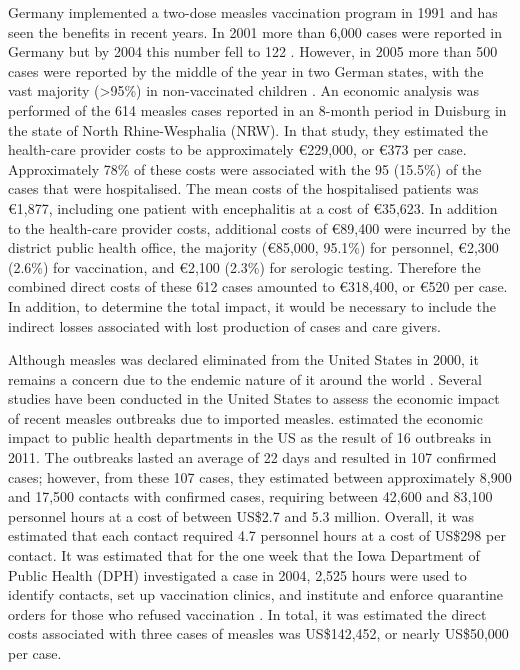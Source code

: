 \documentclass{article}
\begin{document}
Germany implemented a two-dose measles vaccination program in 1991 and has seen the benefits in recent years. In 2001 more than 6,000 cases were reported in Germany but by 2004 this number fell to 122 \citep{wichmann9}. However, in 2005 more than 500 cases were reported by the middle of the year in two German states, with the vast majority (>95\%) in non-vaccinated children \citep{siedler6}. An economic analysis was performed of the 614 measles cases reported in an 8-month period in Duisburg in the state of North Rhine-Wesphalia (NRW). In that study, they estimated the health-care provider costs to be approximately \euro 229,000, or \euro 373 per case. Approximately 78\% of these costs were associated with the 95 (15.5\%) of the cases that were hospitalised. The mean costs of the hospitalised patients was  \euro 1,877, including one patient with encephalitis at a cost of \euro 35,623. In addition to the health-care provider costs, additional costs of \euro 89,400 were incurred by the district public health office, the majority (\euro 85,000, 95.1\%) for personnel, \euro 2,300 (2.6\%) for vaccination, and \euro 2,100 (2.3\%) for serologic testing. Therefore the combined direct costs of these 612 cases amounted to \euro 318,400, or \euro 520 per case. In addition, to determine the total impact, it would be necessary to include the indirect losses associated with lost production of cases and care givers.

Although measles was declared eliminated from the United States in 2000, it remains a concern due to the endemic nature of it around the world \citep{parker6}. Several studies have been conducted in the United States to assess the economic impact of recent measles outbreaks due to imported measles.  \citep{ortegasanchez14} estimated the economic impact to public health departments in the US as the result of 16 outbreaks in 2011. The outbreaks lasted an average of 22 days and resulted in 107 confirmed cases; however, from these 107 cases, they estimated between approximately 8,900 and 17,500 contacts with confirmed cases, requiring between 42,600 and 83,100 personnel hours at a cost of between US\$2.7 and 5.3 million. Overall, it was estimated that each contact required 4.7 personnel hours at a cost of US\$298 per contact.
It was estimated that for the one week that the Iowa Department of Public Health (DPH) investigated a case in 2004, 2,525 hours were used to identify contacts, set up vaccination clinics, and institute and enforce quarantine orders for those who refused vaccination \citep{dayan5}. In total, it was estimated the direct costs associated with three cases of measles was US\$142,452, or nearly US\$50,000 per case.
\end{document}
